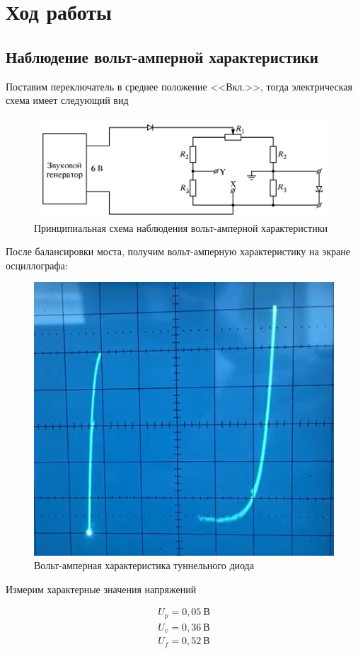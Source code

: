 \documentclass[a4paper,12pt]{article}
\begin{document}
\section*{Ход работы}

\subsection*{Наблюдение вольт-амперной характеристики}

Поставим переключатель в среднее положение <<Вкл.>>, тогда электрическая схема имеет следующий вид

\begin{figure}[h!]
	\centering
	\includegraphics[width=\linewidth]{scheme_2}
	\caption{Принципиальная схема наблюдения вольт-амперной характеристики}
\end{figure}

После балансировки моста, получим вольт-амперную характеристику на экране осциллографа:

\begin{figure}[h!]
	\centering
	\includegraphics[width=0.5\linewidth]{osciloscope}
	\caption{Вольт-амперная характеристика туннельного диода}
\end{figure}

Измерим характерные значения напряжений 

\begin{align*}
	U_p = 0,05 \ В \\
	U_v = 0,36 \ В \\
	U_f = 0,52 \ В \\ 
\end{align*}
\end{document}
